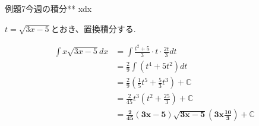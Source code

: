 \documentclass[main]{subfiles}
\begin{document}
\begin{newmondai}{例題}{7}{今週の積分}{**}
    \int xdx
\end{newmondai}

\solutionhead
\hfill
$t=\sqrt{3x-5}$とおき、置換積分する.\hfill\ 


\begin{align*}
    \int x\sqrt{3x-5}dx
        &= \int\frac{t^2+5}{3}\cdot t\cdot \frac{2t}{3}dt \\
        &= \frac{2}{9}\int\left(t^4+5t^2\right)dt \\
        &= \frac{2}{9}\left(\frac{1}{5}t^5+\frac{5}{3}t^3\right)+\mathbb{C} \\
        &= \frac{2}{45}t^3\left(t^2+\frac{25}{3}\right)+\mathbb{C} \\
        &= \boldsymbol{\frac{2}{45}\left(3x-5\right)\sqrt{3x-5}\left(3x\frac{10}{3}\right)+\mathbb{C}}
\end{align*}
\end{document}
